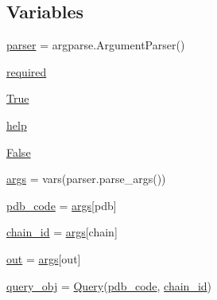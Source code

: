 \subsection*{Variables}
\begin{DoxyCompactItemize}
\item 
\hyperlink{namespacefragalysis__api_1_1xcimporter_1_1pdbquery_a3514999e572ac94add2960dc6995779b}{parser} = argparse.\+Argument\+Parser()
\item 
\hyperlink{namespacefragalysis__api_1_1xcimporter_1_1pdbquery_a9c2b6f4a3b0d3e651f5560f2752e1e92}{required}
\item 
\hyperlink{namespacefragalysis__api_1_1xcimporter_1_1pdbquery_a14bffa8dc36a0e9f3f33ca1788fc830b}{True}
\item 
\hyperlink{namespacefragalysis__api_1_1xcimporter_1_1pdbquery_ad98cc62edc3567271d9a427f1e2ac760}{help}
\item 
\hyperlink{namespacefragalysis__api_1_1xcimporter_1_1pdbquery_a3770b11dc2a201e36e0dc3fee520208b}{False}
\item 
\hyperlink{namespacefragalysis__api_1_1xcimporter_1_1pdbquery_aa63ace70140ec79679f3f8be87bb2564}{args} = vars(parser.\+parse\+\_\+args())
\item 
\hyperlink{namespacefragalysis__api_1_1xcimporter_1_1pdbquery_a05fc5cbce237e976cd5303cd1f1141ad}{pdb\+\_\+code} = \hyperlink{namespacefragalysis__api_1_1xcimporter_1_1pdbquery_aa63ace70140ec79679f3f8be87bb2564}{args}\mbox{[}\textquotesingle{}pdb\textquotesingle{}\mbox{]}
\item 
\hyperlink{namespacefragalysis__api_1_1xcimporter_1_1pdbquery_a76497bee6f8c2a47827613858ded72d5}{chain\+\_\+id} = \hyperlink{namespacefragalysis__api_1_1xcimporter_1_1pdbquery_aa63ace70140ec79679f3f8be87bb2564}{args}\mbox{[}\textquotesingle{}chain\textquotesingle{}\mbox{]}
\item 
\hyperlink{namespacefragalysis__api_1_1xcimporter_1_1pdbquery_a7e1833466eb7f1ed11f7bf148033aa2b}{out} = \hyperlink{namespacefragalysis__api_1_1xcimporter_1_1pdbquery_aa63ace70140ec79679f3f8be87bb2564}{args}\mbox{[}\textquotesingle{}out\textquotesingle{}\mbox{]}
\item 
\hyperlink{namespacefragalysis__api_1_1xcimporter_1_1pdbquery_a71559cdf9dc34b17a0a1833931cf988f}{query\+\_\+obj} = \hyperlink{classfragalysis__api_1_1xcimporter_1_1pdbquery_1_1_query}{Query}(\hyperlink{namespacefragalysis__api_1_1xcimporter_1_1pdbquery_a05fc5cbce237e976cd5303cd1f1141ad}{pdb\+\_\+code}, \hyperlink{namespacefragalysis__api_1_1xcimporter_1_1pdbquery_a76497bee6f8c2a47827613858ded72d5}{chain\+\_\+id})

\end{DoxyCompactItemize}
